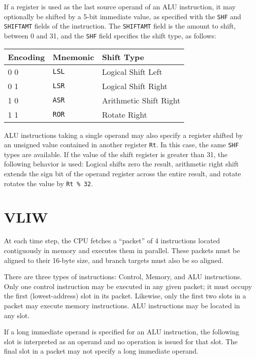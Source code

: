 \documentclass[11pt,openany]{report}
\begin{document}
If a register is used as the last source operand of an ALU instruction, it may optionally be shifted by a 5-bit immediate value, as specified with the \texttt{SHF} and \texttt{SHIFTAMT} fields of the instruction. The \texttt{SHIFTAMT} field is the amount to shift, between 0 and 31, and the \texttt{SHF} field specifies the shift type, as follows:

\begin{table}[!h]
\centering
\begin{tabular}{l|l|l}
Encoding & Mnemonic & Shift Type\\
\hline
0 0 & \texttt{LSL} & Logical Shift Left \\ 
0 1 & \texttt{LSR} & Logical Shift Right \\ 
1 0 & \texttt{ASR} & Arithmetic Shift Right \\ 
1 1 & \texttt{ROR} & Rotate Right
\end{tabular}
\end{table}

ALU instructions taking a single operand may also specify a register shifted by an unsigned value contained in another register \texttt{Rt}. In this case, the same \texttt{SHF} types are available. If the value of the shift register is greater than 31, the following behavior is used: Logical shifts zero the result, arithmetic right shift extends the sign bit of the operand register across the entire result, and rotate rotates the value by \texttt{Rt \% 32}.

\section{VLIW}
At each time step, the CPU fetches a ``packet'' of 4 instructions located contiguously in memory and executes them in parallel. These packets must be aligned to their 16-byte size, and branch targets must also be so aligned.

There are three types of instructions: Control, Memory, and ALU instructions. Only one control instruction may be executed in any given packet; it must occupy the first (lowest-address) slot in its packet. Likewise, only the first two slots in a packet may execute memory instructions. ALU instructions may be located in any slot.

If a long immediate operand is specified for an ALU instruction, the following slot is interpreted as an operand and no operation is issued for that slot. The final slot in a packet may not specify a long immediate operand.
\end{document}
